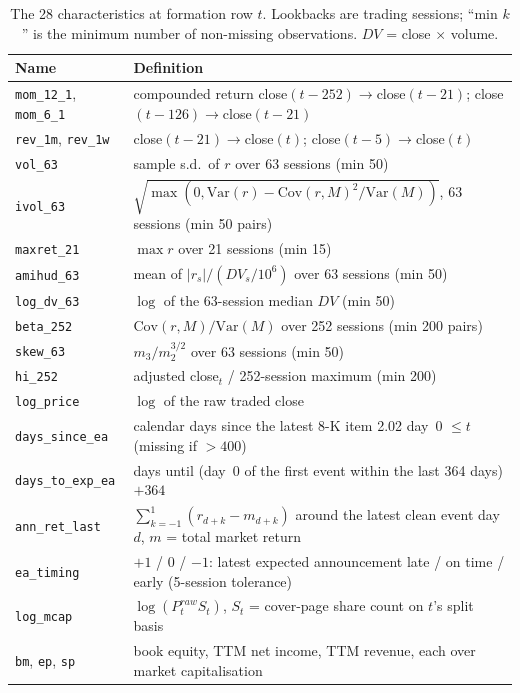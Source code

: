 \begin{table}[t]
\centering\footnotesize
\setlength{\tabcolsep}{4pt}
\caption{The 28 characteristics at formation row $t$. Lookbacks are trading sessions; ``min $k$'' is the minimum number of non-missing observations. $DV$ = close $\times$ volume.}
\label{tab:features}
\begin{tabular}{@{}ll@{}}
\toprule
Name & Definition \\
\midrule
\texttt{mom\_12\_1}, \texttt{mom\_6\_1} & compounded return close$(t{-}252)\to$close$(t{-}21)$; close$(t{-}126)\to$close$(t{-}21)$ \\
\texttt{rev\_1m}, \texttt{rev\_1w} & close$(t{-}21)\to$close$(t)$; close$(t{-}5)\to$close$(t)$ \\
\texttt{vol\_63} & sample s.d.\ of $r$ over 63 sessions (min 50) \\
\texttt{ivol\_63} & $\sqrt{\max(0,\mathrm{Var}(r)-\mathrm{Cov}(r,M)^2/\mathrm{Var}(M))}$, 63 sessions (min 50 pairs) \\
\texttt{maxret\_21} & $\max r$ over 21 sessions (min 15) \\
\texttt{amihud\_63} & mean of $|r_s|/(DV_s/10^6)$ over 63 sessions (min 50) \\
\texttt{log\_dv\_63} & $\log$ of the 63-session median $DV$ (min 50) \\
\texttt{beta\_252} & $\mathrm{Cov}(r,M)/\mathrm{Var}(M)$ over 252 sessions (min 200 pairs) \\
\texttt{skew\_63} & $m_3/m_2^{3/2}$ over 63 sessions (min 50) \\
\texttt{hi\_252} & adjusted close$_t$ / 252-session maximum (min 200) \\
\texttt{log\_price} & $\log$ of the raw traded close \\
\texttt{days\_since\_ea} & calendar days since the latest 8-K item 2.02 day~0 $\le t$ (missing if $>400$) \\
\texttt{days\_to\_exp\_ea} & days until (day~0 of the first event within the last 364 days) $+364$ \\
\texttt{ann\_ret\_last} & $\sum_{k=-1}^{1}(r_{d+k}-m_{d+k})$ around the latest clean event day $d$, $m$ = total market return \\
\texttt{ea\_timing} & $+1$ / $0$ / $-1$: latest expected announcement late / on time / early (5-session tolerance) \\
\texttt{log\_mcap} & $\log(P^{raw}_t S_t)$, $S_t$ = cover-page share count on $t$'s split basis \\
\texttt{bm}, \texttt{ep}, \texttt{sp} & book equity, TTM net income, TTM revenue, each over market capitalisation \\

\end{tabular}
\end{table}
